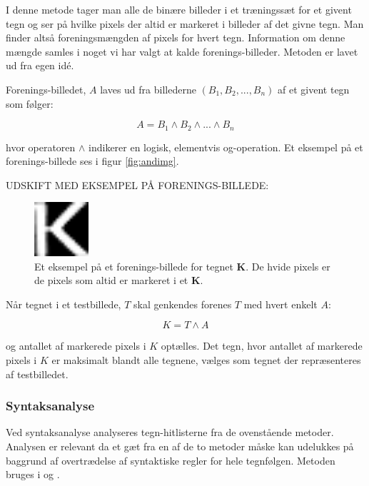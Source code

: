 I denne metode tager man alle de binære billeder i et træningssæt for et givent tegn og ser på hvilke pixels der altid er markeret i billeder af det givne tegn. Man finder altså foreningsmængden af pixels for hvert tegn. Information om denne mængde samles i noget vi har valgt at kalde forenings-billeder. Metoden er lavet ud fra egen idé.

Forenings-billedet, $A$ laves ud fra billederne $(B_{1},B_{2},...,B_{n})$ af et givent tegn som følger:

\begin{displaymath}
A = B_1 \wedge B_2 \wedge ... \wedge B_n
\end{displaymath}

hvor operatoren $\wedge$ indikerer en logisk, elementvis og-operation. Et eksempel på et forenings-billede ses i figur \vref{fig:andimg}.

UDSKIFT MED EKSEMPEL PÅ FORENINGS-BILLEDE:
\begin{figure}[htp]
\centering
\includegraphics[width=2cm]{system/illu/sumimg.png} 
\caption{Et eksempel på et forenings-billede for tegnet \textbf{K}. De hvide pixels er de pixels som altid er markeret i et \textbf{K}.}
\label{fig:andimg}
\end{figure}

Når tegnet i et testbillede, $T$ skal genkendes forenes $T$ med hvert enkelt $A$:

\begin{displaymath}
K = T \wedge A
\end{displaymath}

og antallet af markerede pixels i $K$ optælles. Det tegn, hvor antallet af markerede pixels i $K$ er maksimalt blandt alle tegnene, vælges som tegnet der repræsenteres af testbilledet.

\subsubsection*{Syntaksanalyse}

Ved syntaksanalyse analyseres tegn-hitlisterne fra de ovenstående metoder. Analysen er relevant da et gæt fra en af de to metoder måske kan udelukkes på baggrund af overtrædelse af syntaktiske regler for hele tegnfølgen. Metoden bruges i \cite{nijhuis} og \cite{kwas}.

